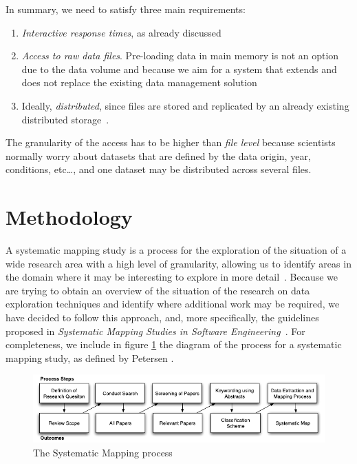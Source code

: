 
In summary, we need to satisfy three main requirements:

\begin{enumerate}
  \item \emph{Interactive response times}, as already discussed
  \item \emph{Access to raw data files}. Pre-loading data in main memory is not an
    option due to the data volume and because we aim for a system that extends and does
    not replace the existing data management solution
  \item Ideally, \emph{distributed}, since files are stored and replicated by an already existing
    distributed storage~\cite{Baud2012}.
\end{enumerate}

The granularity of the access has to be higher than \emph{file level} because
scientists normally worry about datasets that are defined by the data origin,
year, conditions, etc\ldots, and one dataset may be distributed across
several files.

\vfill

\section{Methodology}
\label{sec:mapping/methodology}

A systematic mapping study is a process for the exploration of the
situation of a wide research area with a high level of granularity,
allowing us to identify areas in the domain where it may be interesting to
explore in more detail~\cite{Kitchenham2007}. Because we are trying to obtain
an overview of the situation of the research on data exploration techniques
and identify where additional work may be required, we have decided to follow this
approach, and, more specifically, the guidelines proposed in
\emph{Systematic Mapping Studies in Software Engineering}~\cite{Petersen2007}.
For completeness, we include in figure \ref{fig:systematicmapping_diagram} the
diagram of the process for a systematic mapping study, as defined by
Petersen \etal.

\begin{figure}[ht]
    \centering
    \includegraphics{images/2_mapping/systematicmapping_diagram}
    \caption{The Systematic Mapping process~\cite{Petersen2007}}
    \label{fig:systematicmapping_diagram}
\end{figure}

